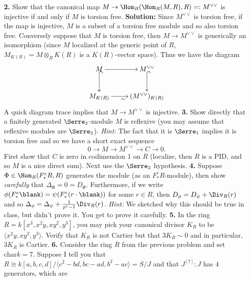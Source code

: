 \documentclass[12pt]{amsart}
\numberwithin{equation}{theorem}
\renewcommand{\:}{\colon}
\theoremstyle{theorem}
\newcommand{\sol}[1]{ \vskip 6pt{\color{blue} {\bf Solution:} #1} \vskip 6pt}
\begin{document}
\noindent
{\bf 2.} Show that the canonical map $M \to \Hom_R(\Hom_R(M, R), R) =: M^{\vee \vee}$ is injective if and only if $M$ is torsion free.
\sol{Since $M^{\vee\vee}$ is torsion free, if the map is injective, $M$ is a subset of a torsion free module and so also torsion free.  Conversely suppose that $M$ is torsion free, then $M \to M^{\vee \vee}$ is generically an isomorphism (since $M$ localized at the generic point of $R$, $M_{K(R)} = M \otimes_R K(R)$ is a $K(R)$-vector space).  Thus we have the diagram
\[
\xymatrix{
M \ar@{^{(}->}[d] \ar[r] & M^{\vee\vee} \ar@{^{(}->}[d] \\
M_{K(R)} \ar[r]_{\sim} & (M^{\vee\vee})_{K(R)}
}
\]
A quick diagram trace implies that $M \to M^{\vee\vee}$ is injective.
}
\newpage
\noindent
{\bf 3.}  Show directly that a finitely generated $\Serre_2$-module $M$ is reflexive (you may assume that reflexive modules are $\Serre_2$).
\vskip 3pt
\emph{Hint:} The fact that it is $\Serre_1$ implies it is torsion free and so we have a short exact sequence
\[
0 \to M \to M^{\vee \vee} \to C \to 0.
\]
First show that $C$ is zero in codimension 1 on $R$ (localize, then $R$ is a PID, and so $M$ is a nice direct sum).  Next use the $\Serre_2$ hypothesis.
\vskip 250pt
\noindent
{\bf 4.}  Suppose $\Phi \in \Hom_R(F^e_* R, R)$ generates the module (as an $F^e_* R$-module), then show \emph{carefully} that $\Delta_{\Phi} = 0 = D_{\Phi}$.  Furthermore, if we write $\phi(F^e_* \blank) = \psi(F^e_* (r \cdot \blank))$ for some $r \in R$, then $D_{\phi} = D_{\psi} + \Div_R(r)$ and so $\Delta_{\phi} = \Delta_{\psi} + {1 \over p^e - 1} \Div_R(r)$.
\vskip 3pt
\emph{Hint:} We sketched why this should be true in class, but didn't prove it.  You get to prove it carefully.
\newpage
\noindent
{\bf 5.}  In the ring $R = k[x^3, x^2y, xy^2, y^3]$, you may pick your canonical divisor $K_R$ to be $\langle x^2y, xy^2, y^3 \rangle$.  Verify that $K_R$ is not Cartier but that $3 K_R \sim 0$ and in particular, $3 K_R$ is Cartier.
\vskip 275pt
\noindent
{\bf 6.}  Consider the ring $R$ from the previous problem and set $\mathrm{char} k = 7$.  Suppose I tell you that $R \cong k[a,b,c,d]/\langle c^2 - bd, bc - ad, b^2 - ac \rangle = S/J$ and that $J^{[7]} : J$ has 4 generators, which are
\end{document}
